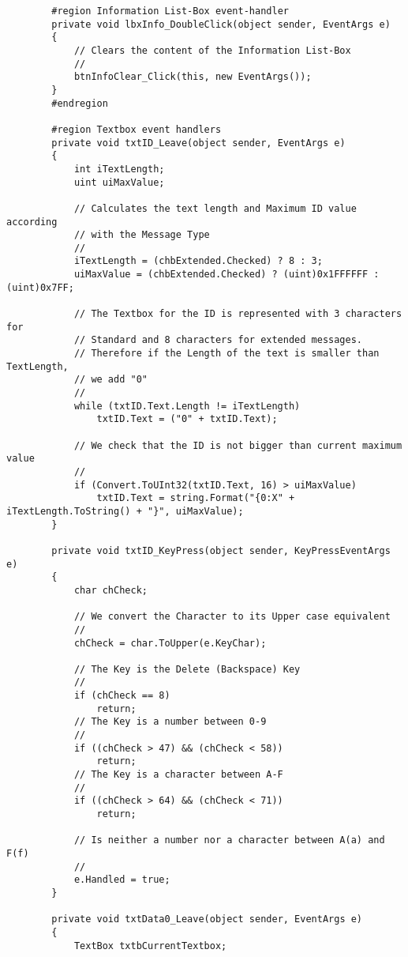 \begin{lstlisting}
        #region Information List-Box event-handler
        private void lbxInfo_DoubleClick(object sender, EventArgs e)
        {
            // Clears the content of the Information List-Box
            //
            btnInfoClear_Click(this, new EventArgs());
        }
        #endregion

        #region Textbox event handlers
        private void txtID_Leave(object sender, EventArgs e)
        {
            int iTextLength;
            uint uiMaxValue;

            // Calculates the text length and Maximum ID value according
            // with the Message Type
            //
            iTextLength = (chbExtended.Checked) ? 8 : 3;
            uiMaxValue = (chbExtended.Checked) ? (uint)0x1FFFFFF : (uint)0x7FF;

            // The Textbox for the ID is represented with 3 characters for
            // Standard and 8 characters for extended messages.
            // Therefore if the Length of the text is smaller than TextLength,
            // we add "0"
            //
            while (txtID.Text.Length != iTextLength)
                txtID.Text = ("0" + txtID.Text);

            // We check that the ID is not bigger than current maximum value
            //
            if (Convert.ToUInt32(txtID.Text, 16) > uiMaxValue)
                txtID.Text = string.Format("{0:X" + iTextLength.ToString() + "}", uiMaxValue);
        }

        private void txtID_KeyPress(object sender, KeyPressEventArgs e)
        {
            char chCheck;

            // We convert the Character to its Upper case equivalent
            //
            chCheck = char.ToUpper(e.KeyChar);

            // The Key is the Delete (Backspace) Key
            //
            if (chCheck == 8)
                return;
            // The Key is a number between 0-9
            //
            if ((chCheck > 47) && (chCheck < 58))
                return;
            // The Key is a character between A-F
            //
            if ((chCheck > 64) && (chCheck < 71))
                return;

            // Is neither a number nor a character between A(a) and F(f)
            //
            e.Handled = true;
        }

        private void txtData0_Leave(object sender, EventArgs e)
        {
            TextBox txtbCurrentTextbox;


\end{lstlisting}

